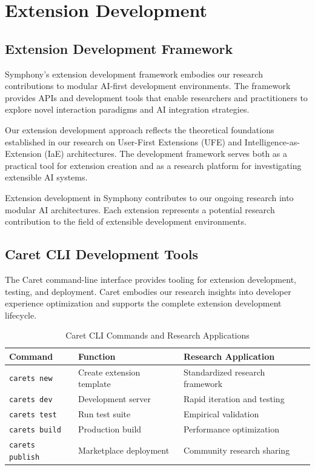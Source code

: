 \section*{Extension Development}

\subsection*{Extension Development Framework}

Symphony's extension development framework embodies our research contributions to modular AI-first development environments. The framework provides APIs and development tools that enable researchers and practitioners to explore novel interaction paradigms and AI integration strategies.

Our extension development approach reflects the theoretical foundations established in our research on User-First Extensions (UFE) and Intelligence-as-Extension (IaE) architectures. The development framework serves both as a practical tool for extension creation and as a research platform for investigating extensible AI systems.

\begin{infobox}[title=Research-Oriented Extension Development]
Extension development in Symphony contributes to our ongoing research into modular AI architectures. Each extension represents a potential research contribution to the field of extensible development environments.
\end{infobox}

\subsection*{Caret CLI Development Tools}

The Caret command-line interface provides tooling for extension development, testing, and deployment. Caret embodies our research insights into developer experience optimization and supports the complete extension development lifecycle.

\begin{table}[ht]
\centering
\begin{tabular}{@{}lll@{}}
\toprule
\textbf{Command} & \textbf{Function} & \textbf{Research Application} \\
\midrule
\texttt{carets new} & Create extension template & Standardized research framework \\
\texttt{carets dev} & Development server & Rapid iteration and testing \\
\texttt{carets test} & Run test suite & Empirical validation \\
\texttt{carets build} & Production build & Performance optimization \\
\texttt{carets publish} & Marketplace deployment & Community research sharing \\
\bottomrule
\end{tabular}
\caption{Caret CLI Commands and Research Applications}
\end{table}

